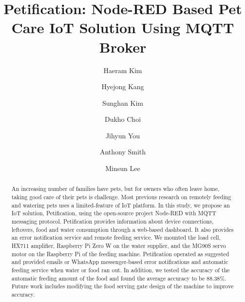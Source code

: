 \documentclass[conference]{IEEEtran}
\begin{document}
\title{Petification: Node-RED Based Pet Care IoT Solution Using MQTT Broker}

\author[*]{Haeram Kim}
\author[*]{Hyejong Kang}
\author[*]{Sunghan Kim}
\author[$\dag$]{Dukho Choi}
\author[$\ddag$]{Jihyun You}
\author[$\mathsection$]{Anthony Smith}
\author[*]{Minsun Lee}

\maketitle 

\begin{abstract}
An increasing number of families have pets, but for owners who often leave home, taking good care of their pets is challenge.
Most previous research on remotely feeding and watering pets uses a limited-feature of IoT platform. %
In this study, we propose an IoT solution, Petification, using the open-source project Node-RED with MQTT messaging protocol. 
Petification provides information about device connections, leftovers, food and water consumption through a web-based dashboard.
It also provides an error notification service and remote feeding service. 
We mounted the load cell, HX711 amplifier, Raspberry Pi Zero W on the water supplier, and the MG90S servo motor on the Raspberry Pi of the feeding machine.
Petification operated as suggested and provided emails or WhatsApp messenger-based error notifications and automatic feeding service when water or food ran out. 
In addition, we tested the accuracy of the automatic feeding amount of the food and found the average accuracy to be 88.38\%.
Future work includes modifying the food serving gate design of the machine to improve accuracy. 
\end{abstract}
\end{document}
